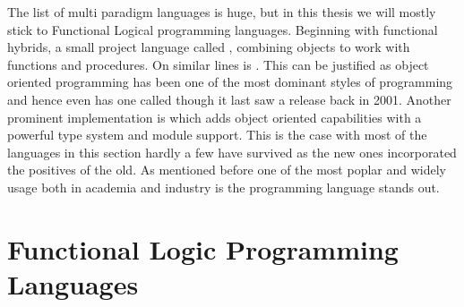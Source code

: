 \documentclass[thesis-solanki.tex]{subfiles}
\begin{document}
The list of multi paradigm languages is huge, but in this thesis we will mostly stick to Functional Logical programming languages. Beginning with functional hybrids, a small project language called  \cite{website:virgil}, combining objects to work with functions and procedures. On similar lines is  \cite{website:closwiki}. This can be justified as object oriented programming has been one of the most dominant styles of programming and hence even  has one called  \cite{website:ohaskell} though it last saw a release back in 2001. Another prominent implementation is  \cite{website:ocamlwiki,website:ocamllang} which adds object oriented capabilities with a powerful type system and module support. This is the case with most of the languages in this section hardly a few have survived as the new ones incorporated the positives of the old.  As mentioned before one of the most poplar \cite{website:langpop} and widely usage both in academia and industry is the  \cite{website:scala} programming language stands out.       

\begin{comment}
\begin{enumerate}
\item \progLang{Scala}, Object Functional Programming Language.

\item Virgil, Object Functional Programming Language.

\item CLOS, Common Lisp Object System.

\item .......................????????
\end{enumerate}
\end{comment}

\section{Functional Logic Programming Languages}
\end{document}
